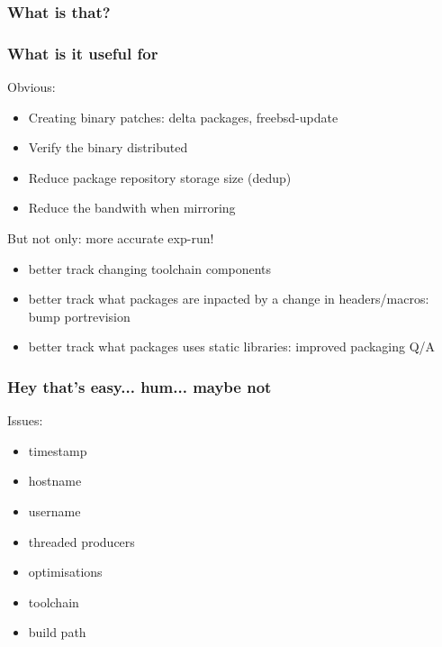 \begin{frame}
	\frametitle{What is that?}
\end{frame}

\begin{frame}
	\frametitle{What is it useful for}
	Obvious:
	\begin{itemize}
		\item Creating binary patches: delta packages, freebsd-update
		\item Verify the binary distributed
		\item Reduce package repository storage size (dedup)
		\item Reduce the bandwith when mirroring
	\end{itemize}
	\pause
	But not only: more accurate exp-run!
	\begin{itemize}
		\item better track changing toolchain components
		\item better track what packages are inpacted by a change in headers/macros: bump portrevision
		\item better track what packages uses static libraries: improved packaging Q/A
	\end{itemize}
\end{frame}

\begin{frame}
	\frametitle{Hey that's easy... hum... maybe not}
	Issues:
	\begin{itemize}
		\item timestamp
		\pause
		\item hostname
		\pause
		\item username
		\pause
		\item threaded producers
		\pause
		\item optimisations
		\pause
		\item toolchain
		\pause
		\item build path
	\end{itemize}
\end{frame}

